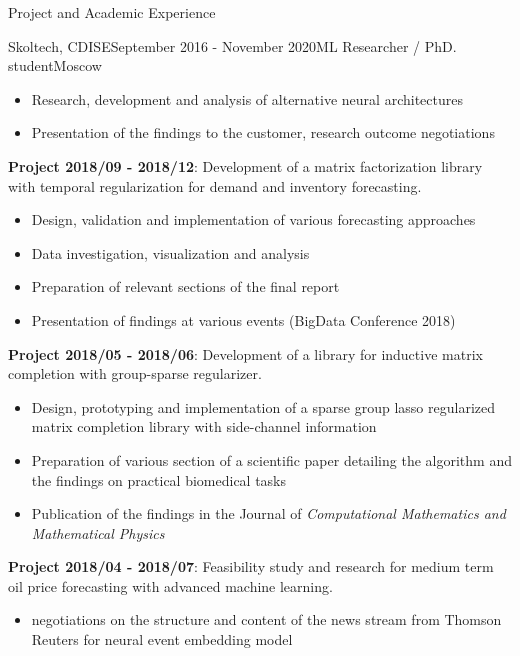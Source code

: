 \documentclass{resume} %
\begin{document}
\begin{rSection}{Project and Academic Experience}
\begin{rSubsection}{Skoltech, CDISE}{September 2016 - November 2020}{ML Researcher / PhD. student}{Moscow}
\begin{itemize}
        \item Research, development and analysis of alternative neural architectures
        
        \item Presentation of the findings to the customer, research outcome negotiations
    \end{itemize}

    \medskip
    \item \textbf{Project 2018/09 - 2018/12}:
    Development of a matrix factorization library with temporal regularization for demand
    and inventory forecasting. \begin{itemize}
        \item Design, validation and implementation of various forecasting approaches
        
        \item Data investigation, visualization and analysis
        
        \item Preparation of relevant sections of the final report
        
        \item Presentation of findings at various events (BigData Conference 2018)
    \end{itemize}

    \medskip
    \item \textbf{Project 2018/05 - 2018/06}:
    Development of a library for inductive matrix completion with group-sparse regularizer.
    \begin{itemize}
        \item Design, prototyping and implementation of a sparse group lasso regularized
        matrix completion library with side-channel information
        
        \item Preparation of various section of a scientific paper detailing the algorithm
        and the findings on practical biomedical tasks
        
        \item Publication of the findings in the Journal of \emph{Computational Mathematics
        and Mathematical Physics}
    \end{itemize}

    \medskip
    \item \textbf{Project 2018/04 - 2018/07}:
    Feasibility study and research for medium term oil price forecasting with advanced machine
    learning. \begin{itemize}
        \item negotiations on the structure and content of the news stream from Thomson Reuters
        for neural event embedding model
        

\end{itemize}
\end{rSubsection}
\end{rSection}
\end{document}

